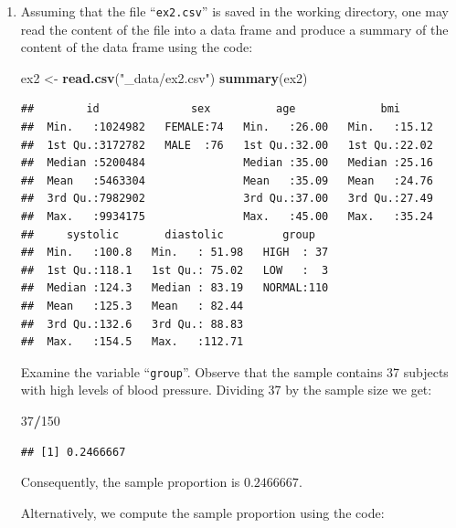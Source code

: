 \documentclass[
]{krantz}
\makeatletter
\newenvironment{Shaded}{\begin{snugshade}}{\end{snugshade}}
\newcommand{\DecValTok}[1]{\textcolor[rgb]{0.00,0.00,0.81}{#1}}
\newcommand{\KeywordTok}[1]{\textcolor[rgb]{0.13,0.29,0.53}{\textbf{#1}}}
\newcommand{\NormalTok}[1]{#1}
\newcommand{\OperatorTok}[1]{\textcolor[rgb]{0.81,0.36,0.00}{\textbf{#1}}}
\newcommand{\StringTok}[1]{\textcolor[rgb]{0.31,0.60,0.02}{#1}}
\newenvironment{kframe}{%
\medskip{}
\setlength{\fboxsep}{.8em}
 \def\at@end@of@kframe{}%
 \ifinner\ifhmode%
  \def\at@end@of@kframe{\end{minipage}}%
  \begin{minipage}{\columnwidth}%
 \fi\fi%
 \def\FrameCommand##1{\hskip\@totalleftmargin \hskip-\fboxsep
 \colorbox{shadecolor}{##1}\hskip-\fboxsep
     \hskip-\linewidth \hskip-\@totalleftmargin \hskip\columnwidth}%
 \MakeFramed {\advance\hsize-\width
   \@totalleftmargin\z@ \linewidth\hsize
   \@setminipage}}%
 {\par\unskip\endMakeFramed%
 \at@end@of@kframe}
\renewenvironment{Shaded}{\begin{kframe}}{\end{kframe}}
\theoremstyle{definition}
\theoremstyle{definition}
\theoremstyle{definition}
\theoremstyle{remark}
\makeatother
\begin{document}
\begin{enumerate}
\def\labelenumi{\arabic{enumi}.}
\item
  Assuming that the file ``\texttt{ex2.csv}''
  is saved in the working directory, one may read the content of the file
  into a data frame and produce a summary of the content of the data frame
  using the code:

\begin{Shaded}
\begin{Highlighting}[]
\NormalTok{ex2 <-}\StringTok{ }\KeywordTok{read.csv}\NormalTok{(}\StringTok{"_data/ex2.csv"}\NormalTok{)}
\KeywordTok{summary}\NormalTok{(ex2)}
\end{Highlighting}
\end{Shaded}

\begin{verbatim}
##        id              sex          age             bmi       
##  Min.   :1024982   FEMALE:74   Min.   :26.00   Min.   :15.12  
##  1st Qu.:3172782   MALE  :76   1st Qu.:32.00   1st Qu.:22.02  
##  Median :5200484               Median :35.00   Median :25.16  
##  Mean   :5463304               Mean   :35.09   Mean   :24.76  
##  3rd Qu.:7982902               3rd Qu.:37.00   3rd Qu.:27.49  
##  Max.   :9934175               Max.   :45.00   Max.   :35.24  
##     systolic       diastolic         group    
##  Min.   :100.8   Min.   : 51.98   HIGH  : 37  
##  1st Qu.:118.1   1st Qu.: 75.02   LOW   :  3  
##  Median :124.3   Median : 83.19   NORMAL:110  
##  Mean   :125.3   Mean   : 82.44               
##  3rd Qu.:132.6   3rd Qu.: 88.83               
##  Max.   :154.5   Max.   :112.71
\end{verbatim}

  Examine the variable ``\texttt{group}''. Observe that the sample contains 37
  subjects with high levels of blood pressure. Dividing 37 by the sample
  size we get:

\begin{Shaded}
\begin{Highlighting}[]
\DecValTok{37}\OperatorTok{/}\DecValTok{150}
\end{Highlighting}
\end{Shaded}

\begin{verbatim}
## [1] 0.2466667
\end{verbatim}

  Consequently, the sample proportion is \(0.2466667\).

  Alternatively, we compute the sample proportion using the code:


\end{enumerate}
\end{document}
